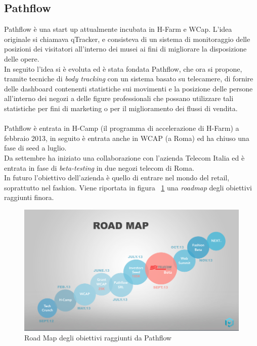 \subsection{Pathflow} \label{sec:pathflow}
Pathflow è una start up attualmente incubata in H-Farm e WCap. 
L'idea originale si chiamava qTracker, e consisteva di un sistema di monitoraggio delle posizioni dei visitatori all'interno dei musei ai fini di migliorare la disposizione delle opere. \\
In seguito l'idea si è evoluta ed è stata fondata Pathflow, che ora si propone, tramite tecniche di \textit{body tracking} con un sistema basato su telecamere, di fornire delle dashboard contenenti statistiche sui movimenti e la posizione delle persone all'interno dei negozi a delle figure professionali che possano utilizzare tali statistiche per fini di marketing o per il miglioramento dei flussi di vendita. \\ \\
Pathflow è entrata in H-Camp (il programma di accelerazione di H-Farm) a febbraio 2013, in seguito è entrata anche in WCAP (a Roma) ed ha chiuso una fase di seed a luglio. \\ 
Da settembre ha iniziato una collaborazione con l'azienda Telecom Italia ed è entrata in fase di \textit{beta-testing} in due negozi telecom di Roma. \\
In futuro l'obiettivo dell'azienda è quello di entrare nel mondo del retail, soprattutto nel fashion. 
Viene riportata in figura ~\ref{fig:roadmap} una \textit{roadmap} degli obiettivi raggiunti finora.
\begin{figure}[!h]
\centering
\includegraphics[scale=0.4]{./images/roadmap.png}
\caption{Road Map degli obiettivi raggiunti da Pathflow}
\label{fig:roadmap}
\end{figure}

